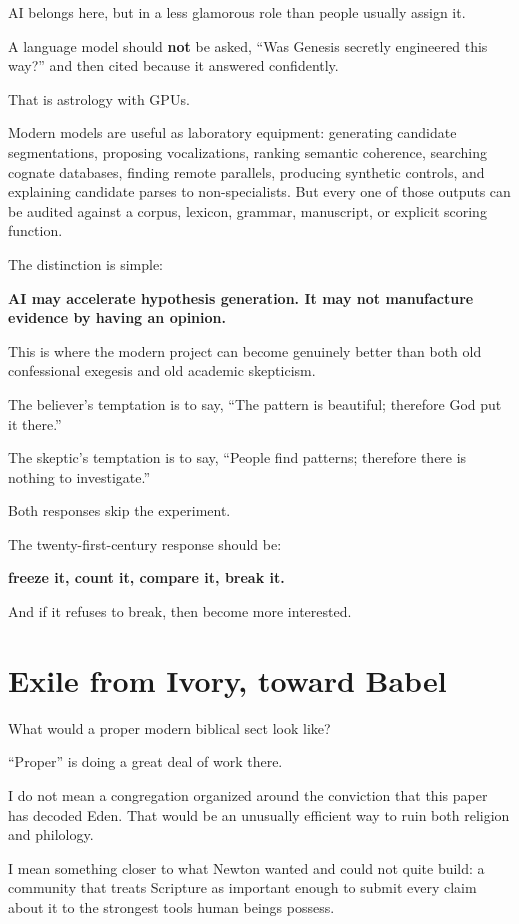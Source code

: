 AI belongs here, but in a less glamorous role than people usually assign it.

A language model should \textbf{not} be asked, ``Was Genesis secretly engineered this way?'' and then cited because it answered confidently.

That is astrology with GPUs.

Modern models are useful as laboratory equipment: generating candidate segmentations, proposing vocalizations, ranking semantic coherence, searching cognate databases, finding remote parallels, producing synthetic controls, and explaining candidate parses to non-specialists. But every one of those outputs can be audited against a corpus, lexicon, grammar, manuscript, or explicit scoring function.

The distinction is simple:

\textbf{AI may accelerate hypothesis generation. It may not manufacture evidence by having an opinion.}

This is where the modern project can become genuinely better than both old confessional exegesis and old academic skepticism.

The believer's temptation is to say, ``The pattern is beautiful; therefore God put it there.''

The skeptic's temptation is to say, ``People find patterns; therefore there is nothing to investigate.''

Both responses skip the experiment.

The twenty-first-century response should be:

\textbf{freeze it, count it, compare it, break it.}

And if it refuses to break, then become more interested.

\section*{Exile from Ivory, toward Babel}

What would a proper modern biblical sect look like?

``Proper'' is doing a great deal of work there.

I do not mean a congregation organized around the conviction that this paper has decoded Eden. That would be an unusually efficient way to ruin both religion and philology.

I mean something closer to what Newton wanted and could not quite build: a community that treats Scripture as important enough to submit every claim about it to the strongest tools human beings possess.

